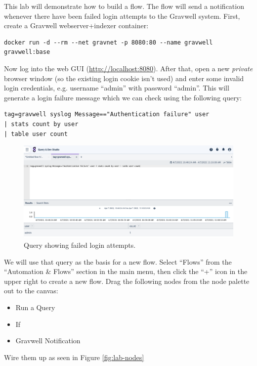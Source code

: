 This lab will demonstrate how to build a flow. The flow will send a notification whenever there have been failed login attempts to the Gravwell system. First, create a Gravwell webserver+indexer container:

\begin{Verbatim}[breaklines=true]
docker run -d --rm --net gravnet -p 8080:80 --name gravwell gravwell:base
\end{Verbatim}

Now log into the web GUI (\href{http://localhost:8080}{http://localhost:8080}). After that, open a new \emph{private} browser window (so the existing login cookie isn't used) and enter some invalid login credentials, e.g. username ``admin'' with password ``admin''. This will generate a login failure message which we can check using the following query:

\begin{Verbatim}[breaklines=true]
tag=gravwell syslog Message=="Authentication failure" user 
| stats count by user 
| table user count
\end{Verbatim}

\begin{figure}
	\includegraphics[width=0.85\linewidth]{images/lab-failed-logins.png}
	\caption{Query showing failed login attempts.}
	\label{fig:lab-failed-logins}
\end{figure}

We will use that query as the basis for a new flow. Select ``Flows'' from the ``Automation \& Flows'' section in the main menu, then click the ``+'' icon in the upper right to create a new flow. Drag the following nodes from the node palette out to the canvas:

\begin{itemize}
\item Run a Query
\item If
\item Gravwell Notification
\end{itemize}

Wire them up as seen in Figure \ref{fig:lab-nodes}

